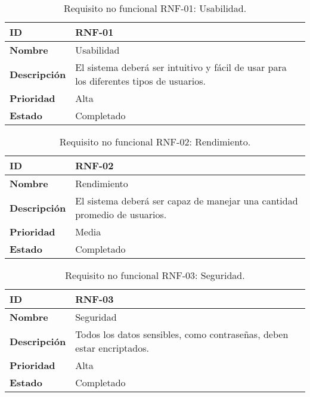 \begin{table}[H]
    \centering
    \begin{tabular}{|l|p{9.5cm}|}
        \hline
        \textbf{ID} & RNF-01 \\
        \hline
        \textbf{Nombre} & Usabilidad \\
        \hline
        \textbf{Descripción} & El sistema deberá ser intuitivo y fácil de usar para los diferentes tipos de usuarios. \\
        \hline
        \textbf{Prioridad} & Alta \\
        \hline
        \textbf{Estado} & Completado \\
        \hline
    \end{tabular}
    \caption{Requisito no funcional RNF-01: Usabilidad.}
    \label{table:req-RNF31}
\end{table}

\begin{table}[H]
    \centering
    \begin{tabular}{|l|p{9.5cm}|}
        \hline
        \textbf{ID} & RNF-02 \\
        \hline
        \textbf{Nombre} & Rendimiento \\
        \hline
        \textbf{Descripción} & El sistema deberá ser capaz de manejar una cantidad promedio de usuarios. \\
        \hline
        \textbf{Prioridad} & Media \\
        \hline
        \textbf{Estado} & Completado \\
        \hline
    \end{tabular}
    \caption{Requisito no funcional RNF-02: Rendimiento.}
    \label{table:req-RNF32}
\end{table}

\begin{table}[H]
    \centering
    \begin{tabular}{|l|p{9.5cm}|}
        \hline
        \textbf{ID} & RNF-03 \\
        \hline
        \textbf{Nombre} & Seguridad \\
        \hline
        \textbf{Descripción} & Todos los datos sensibles, como contraseñas, deben estar encriptados. \\
        \hline
        \textbf{Prioridad} & Alta \\
        \hline
        \textbf{Estado} & Completado \\
        \hline
    \end{tabular}
    \caption{Requisito no funcional RNF-03: Seguridad.}
    \label{table:req-RNF33}
\end{table}

